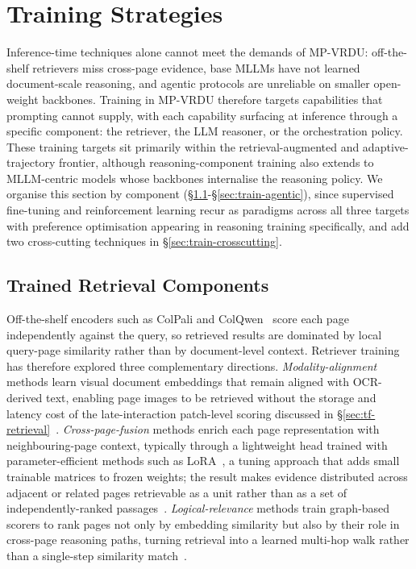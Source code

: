 \documentclass[11pt]{article}
\begin{document}
\section{Training Strategies}
\label{sec:training}

Inference-time techniques alone cannot meet the demands of MP-VRDU: off-the-shelf retrievers miss cross-page evidence, base MLLMs have not learned document-scale reasoning, and agentic protocols are unreliable on smaller open-weight backbones. Training in MP-VRDU therefore targets capabilities that prompting cannot supply, with each capability surfacing at inference through a specific component: the retriever, the LLM reasoner, or the orchestration policy. These training targets sit primarily within the retrieval-augmented and adaptive-trajectory frontier, although reasoning-component training also extends to MLLM-centric models whose backbones internalise the reasoning policy. We organise this section by component (\S\ref{sec:train-retrieval}-\S\ref{sec:train-agentic}), since supervised fine-tuning and reinforcement learning recur as paradigms across all three targets with preference optimisation appearing in reasoning training specifically, and add two cross-cutting techniques in \S\ref{sec:train-crosscutting}.

\subsection{Trained Retrieval Components}
\label{sec:train-retrieval}

Off-the-shelf encoders such as ColPali and ColQwen~\cite{faysse2024colpali} score each page independently against the query, so retrieved results are dominated by local query-page similarity rather than by document-level context. Retriever training has therefore explored three complementary directions. \textit{Modality-alignment} methods learn visual document embeddings that remain aligned with OCR-derived text, enabling page images to be retrieved without the storage and latency cost of the late-interaction patch-level scoring discussed in \S\ref{sec:tf-retrieval}~\cite{tanaka2025vdocrag}. \textit{Cross-page-fusion} methods enrich each page representation with neighbouring-page context, typically through a lightweight head trained with parameter-efficient methods such as LoRA~\cite{hu2022lora}, a tuning approach that adds small trainable matrices to frozen weights; the result makes evidence distributed across adjacent or related pages retrievable as a unit rather than as a set of independently-ranked passages~\cite{qian2026accurate}. \textit{Logical-relevance} methods train graph-based scorers to rank pages not only by embedding similarity but also by their role in cross-page reasoning paths, turning retrieval into a learned multi-hop walk rather than a single-step similarity match~\cite{wu2025molorag}.
\end{document}
